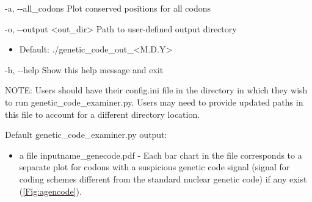 \documentclass{article}
\begin{document}
\begin{description}
\begin{description}
\begin{description}
                    \item -a, -\/-all\_codons \hspace{0.2cm} Plot conserved positions for all codons
                    \item -o, -\/-output \hspace{0.2cm} <out\_dir> \hspace{0.2cm} Path to user-defined output directory
                    \begin{itemize}
                        \item Default: ./genetic\_code\_out\_<M.D.Y>
                    \end{itemize}
                    \item -h, -\/-help \hspace{0.2cm} Show this help message and exit
                \end{description}
            \vspace{0.2cm}
            
            \item NOTE: Users should have their config.ini file in the directory in which they wish to run genetic\_code\_examiner.py. Users may need to provide updated paths in this file to account for a different directory location. 
            \vspace{0.2cm}
            
            \item Default genetic\_code\_examiner.py output:
            \begin{itemize}
                \item a file {inputname}\_genecode.pdf - Each bar chart in the file corresponds to a separate plot for codons with a suspicious genetic code signal (signal for coding schemes different from the standard nuclear genetic code) if any exist (\autoref{Fig:agencode}). 
            \end{itemize}
            \end{description}
        \end{description}
        
\end{document}
